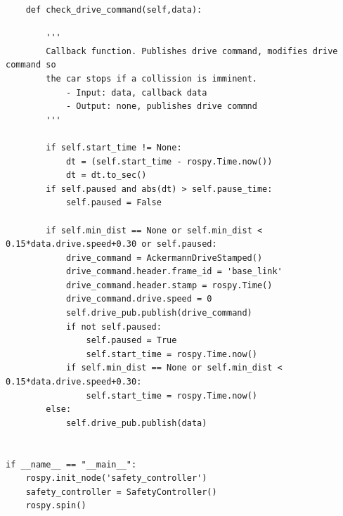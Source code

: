 \documentclass{article}
\begin{document}
{\begin{verbatim}
    def check_drive_command(self,data):

        '''
        Callback function. Publishes drive command, modifies drive command so
        the car stops if a collission is imminent. 
            - Input: data, callback data
            - Output: none, publishes drive commnd
        '''

        if self.start_time != None:
            dt = (self.start_time - rospy.Time.now())
            dt = dt.to_sec()
        if self.paused and abs(dt) > self.pause_time:
            self.paused = False 

        if self.min_dist == None or self.min_dist < 0.15*data.drive.speed+0.30 or self.paused:
            drive_command = AckermannDriveStamped()
            drive_command.header.frame_id = 'base_link'
            drive_command.header.stamp = rospy.Time()
            drive_command.drive.speed = 0
            self.drive_pub.publish(drive_command)
            if not self.paused:
                self.paused = True
                self.start_time = rospy.Time.now()
            if self.min_dist == None or self.min_dist < 0.15*data.drive.speed+0.30:
                self.start_time = rospy.Time.now()
        else:
            self.drive_pub.publish(data)


if __name__ == "__main__":
    rospy.init_node('safety_controller')
    safety_controller = SafetyController()
    rospy.spin()

\end{verbatim}
}
\end{document}
